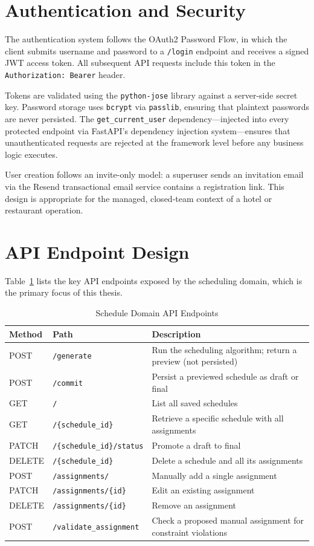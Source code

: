 \section{Authentication and Security}

The authentication system follows the OAuth2 Password Flow, in which the client submits username and password to a \texttt{/login} endpoint and receives a signed JWT access token. All subsequent API requests include this token in the \texttt{Authorization: Bearer} header.

Tokens are validated using the \texttt{python-jose} library against a server-side secret key. Password storage uses \texttt{bcrypt} via \texttt{passlib}, ensuring that plaintext passwords are never persisted. The \texttt{get\_current\_user} dependency—injected into every protected endpoint via FastAPI's dependency injection system—ensures that unauthenticated requests are rejected at the framework level before any business logic executes.

User creation follows an invite-only model: a superuser sends an invitation email via the Resend transactional email service contains a registration link. This design is appropriate for the managed, closed-team context of a hotel or restaurant operation.

\section{API Endpoint Design}

Table~\ref{tab:endpoints} lists the key API endpoints exposed by the scheduling domain, which is the primary focus of this thesis.

\begin{table}[H]
\centering
\caption{Schedule Domain API Endpoints}
\label{tab:endpoints}
\begin{tabular}{p{2cm} p{5cm} p{6cm}}
\toprule
\textbf{Method} & \textbf{Path} & \textbf{Description} \\
\midrule
POST & \texttt{/generate} & Run the scheduling algorithm; return a preview (not persisted) \\
POST & \texttt{/commit} & Persist a previewed schedule as draft or final \\
GET  & \texttt{/} & List all saved schedules \\
GET  & \texttt{/\{schedule\_id\}} & Retrieve a specific schedule with all assignments \\
PATCH & \texttt{/\{schedule\_id\}/status} & Promote a draft to final \\
DELETE & \texttt{/\{schedule\_id\}} & Delete a schedule and all its assignments \\
POST & \texttt{/assignments/} & Manually add a single assignment \\
PATCH & \texttt{/assignments/\{id\}} & Edit an existing assignment \\
DELETE & \texttt{/assignments/\{id\}} & Remove an assignment \\
POST & \texttt{/validate\_assignment} & Check a proposed manual assignment for constraint violations \\
\bottomrule
\end{tabular}
\end{table}

